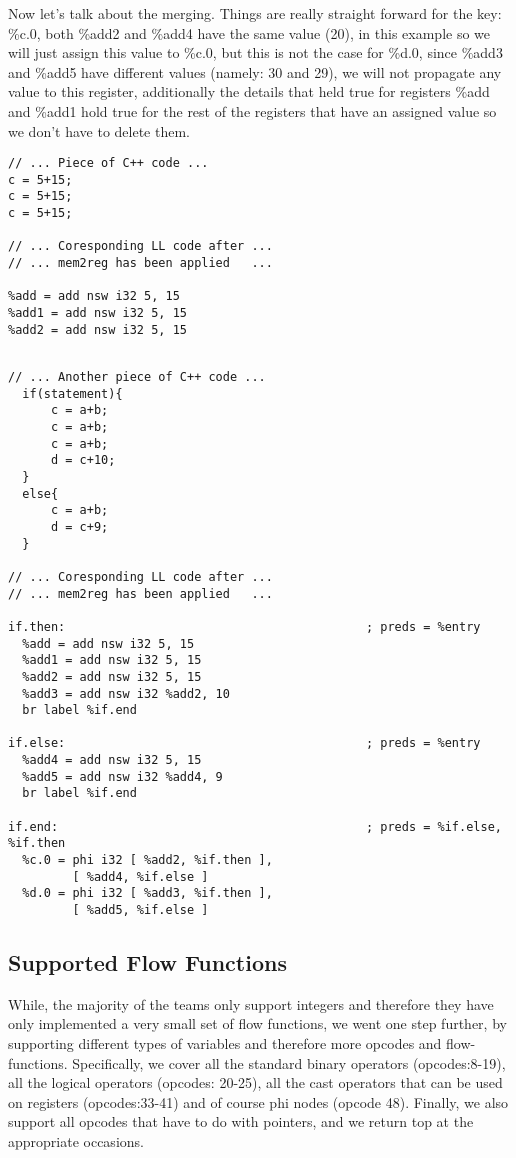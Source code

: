 Now let's talk about the merging. Things are really straight forward for the key: \%c.0, both \%add2 and \%add4 have the same value (20), in this example so we will just assign this value to \%c.0, but this is not the case for \%d.0, since \%add3 and \%add5 have different values (namely: 30 and 29), we will not propagate any value to this register, additionally the details that held true for registers \%add and \%add1 hold true for the rest of the registers that have an assigned value so we don't have to delete them. 


\begin{lstlisting}[caption=SSA preview, label=SSA]
// ... Piece of C++ code ...
c = 5+15;
c = 5+15;
c = 5+15;

// ... Coresponding LL code after ...
// ... mem2reg has been applied   ...

%add = add nsw i32 5, 15
%add1 = add nsw i32 5, 15
%add2 = add nsw i32 5, 15

\end{lstlisting}

\begin{lstlisting}[caption=SSA within a branch preview, label=SSAFF]

// ... Another piece of C++ code ...
  if(statement){
	  c = a+b;
	  c = a+b;
	  c = a+b;
	  d = c+10;
  }
  else{
	  c = a+b;
	  d = c+9;
  }

// ... Coresponding LL code after ...
// ... mem2reg has been applied   ...

if.then:                                          ; preds = %entry
  %add = add nsw i32 5, 15
  %add1 = add nsw i32 5, 15
  %add2 = add nsw i32 5, 15
  %add3 = add nsw i32 %add2, 10
  br label %if.end

if.else:                                          ; preds = %entry
  %add4 = add nsw i32 5, 15
  %add5 = add nsw i32 %add4, 9
  br label %if.end

if.end:                                           ; preds = %if.else, %if.then
  %c.0 = phi i32 [ %add2, %if.then ], 
         [ %add4, %if.else ]
  %d.0 = phi i32 [ %add3, %if.then ], 
         [ %add5, %if.else ]

  \end{lstlisting}
  
  
\subsection*{Supported Flow Functions}
While, the majority of the teams only support integers and therefore they have only implemented a very small set of flow functions, we went one step further, by supporting different types of variables and therefore more opcodes and flow-functions. Specifically, we cover all the standard binary operators (opcodes:8-19), all the logical operators (opcodes: 20-25), all the cast operators that can be used on registers (opcodes:33-41) and of course phi nodes (opcode 48). Finally, we also support all opcodes that have to do with pointers, and we return top at the appropriate occasions.



